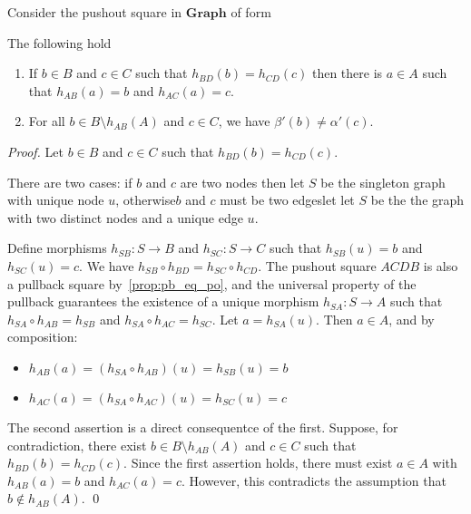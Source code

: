\begin{lemma}
    \label{lem:b_c_same_img_exist_a}
    Consider the pushout square in $\mathbf{Graph}$ of form
    \begin{center}{\normalfont
    }\end{center}
    The following hold 
    \begin{enumerate}
        \item  If $ b\in B $ and $ c \in C $ such that $ h_{BD}(b) = h_{CD}(c) $ then there is $ a \in A $ such that $ h_{AB}(a) = b $ and $ h_{AC}(a)= c $.
        \item  For all \( b \in B \setminus h_{AB}(A) \) and \( c \in C \), we have \( \beta'(b) \neq \alpha'(c) \).
    \end{enumerate}
\end{lemma}
\begin{proof}
     Let \( b \in B \) and \( c \in C \) such that \( h_{BD}(b) = h_{CD}(c) \). 
     
     There are two cases: if $b$ and $c$ are two nodes then let \( S \) be the singleton graph with unique node \( u \), otherwise\textemdash$b$ and $c$ must be two edges\textemdash let let \( S \) be the the graph with two distinct nodes and a unique edge \( u \).
     
     Define morphisms \( h_{SB}: S \to B \) and \( h_{SC}: S \to C \) such that \( h_{SB}(u) = b \) and \( h_{SC}(u) = c \). We have \( h_{SB} \circ h_{BD} = h_{SC} \circ h_{CD} \). The pushout square \( ACDB \) is also a pullback square by~\autoref{prop:pb_eq_po}, and the universal property of the pullback guarantees the existence of a unique morphism \( h_{SA}: S \to A \) such that \( h_{SA} \circ h_{AB} = h_{SB} \) and \( h_{SA} \circ h_{AC} = h_{SC} \). Let \( a = h_{SA}(u) \). Then \( a \in A \), and by composition: 
     \begin{itemize}
        \item \(h_{AB}(a) = (h_{SA} \circ h_{AB})(u) = h_{SB}(u) = b \)
        \item \(h_{AC}(a) = (h_{SA} \circ h_{AC})(u) = h_{SC}(u) = c\)
     \end{itemize} 

    The second assertion is a direct consequentce of the first. Suppose, for contradiction, there exist \( b \in B \setminus h_{AB}(A) \) and \( c \in C \) such that \( h_{BD}(b) = h_{CD}(c) \). Since the first assertion holds, there must exist \( a \in A \) with \( h_{AB}(a) = b \) and \( h_{AC}(a) = c \). However, this contradicts the assumption that \( b \notin h_{AB}(A) \).
    \qed
\end{proof}


